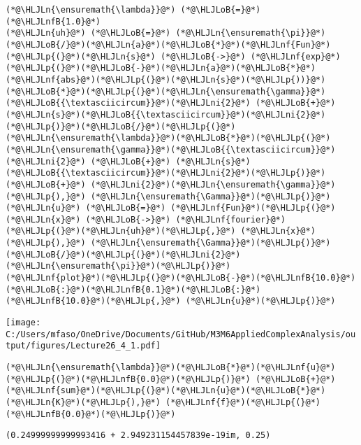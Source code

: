 \documentclass[12pt,landscape]{article}
\newcommand{\HLJLn}[1]{#1}
\newcommand{\HLJLnf}[1]{\textcolor[RGB]{66,102,213}{#1}}
\newcommand{\HLJLnfB}[1]{\textcolor[RGB]{59,151,46}{#1}}
\newcommand{\HLJLni}[1]{\textcolor[RGB]{59,151,46}{#1}}
\newcommand{\HLJLoB}[1]{\textcolor[RGB]{102,102,102}{\textbf{#1}}}
\newcommand{\HLJLp}[1]{#1}
\def\cent#1{\begin{center}#1\end{center} }
\begin{document}
{\begin{lstlisting}
(*@\HLJLn{\ensuremath{\lambda}}@*) (*@\HLJLoB{=}@*) (*@\HLJLnfB{1.0}@*)
(*@\HLJLn{uh}@*) (*@\HLJLoB{=}@*) (*@\HLJLn{\ensuremath{\pi}}@*)(*@\HLJLoB{/}@*)(*@\HLJLn{a}@*)(*@\HLJLoB{*}@*)(*@\HLJLnf{Fun}@*)(*@\HLJLp{(}@*)(*@\HLJLn{s}@*) (*@\HLJLoB{->}@*) (*@\HLJLnf{exp}@*)(*@\HLJLp{(}@*)(*@\HLJLoB{-}@*)(*@\HLJLn{a}@*)(*@\HLJLoB{*}@*)(*@\HLJLnf{abs}@*)(*@\HLJLp{(}@*)(*@\HLJLn{s}@*)(*@\HLJLp{))}@*)(*@\HLJLoB{*}@*)(*@\HLJLp{(}@*)(*@\HLJLn{\ensuremath{\gamma}}@*)(*@\HLJLoB{{\textasciicircum}}@*)(*@\HLJLni{2}@*) (*@\HLJLoB{+}@*) (*@\HLJLn{s}@*)(*@\HLJLoB{{\textasciicircum}}@*)(*@\HLJLni{2}@*)(*@\HLJLp{)}@*)(*@\HLJLoB{/}@*)(*@\HLJLp{(}@*)(*@\HLJLn{\ensuremath{\lambda}}@*)(*@\HLJLoB{*}@*)(*@\HLJLp{(}@*)(*@\HLJLn{\ensuremath{\gamma}}@*)(*@\HLJLoB{{\textasciicircum}}@*)(*@\HLJLni{2}@*) (*@\HLJLoB{+}@*) (*@\HLJLn{s}@*)(*@\HLJLoB{{\textasciicircum}}@*)(*@\HLJLni{2}@*)(*@\HLJLp{)}@*) (*@\HLJLoB{+}@*) (*@\HLJLni{2}@*)(*@\HLJLn{\ensuremath{\gamma}}@*)(*@\HLJLp{),}@*) (*@\HLJLn{\ensuremath{\Gamma}}@*)(*@\HLJLp{)}@*)
(*@\HLJLn{u}@*) (*@\HLJLoB{=}@*) (*@\HLJLnf{Fun}@*)(*@\HLJLp{(}@*)(*@\HLJLn{x}@*) (*@\HLJLoB{->}@*) (*@\HLJLnf{fourier}@*)(*@\HLJLp{(}@*)(*@\HLJLn{uh}@*)(*@\HLJLp{,}@*) (*@\HLJLn{x}@*)(*@\HLJLp{),}@*) (*@\HLJLn{\ensuremath{\Gamma}}@*)(*@\HLJLp{)}@*)(*@\HLJLoB{/}@*)(*@\HLJLp{(}@*)(*@\HLJLni{2}@*)(*@\HLJLn{\ensuremath{\pi}}@*)(*@\HLJLp{)}@*)
(*@\HLJLnf{plot}@*)(*@\HLJLp{(}@*)(*@\HLJLoB{-}@*)(*@\HLJLnfB{10.0}@*)(*@\HLJLoB{:}@*)(*@\HLJLnfB{0.1}@*)(*@\HLJLoB{:}@*)(*@\HLJLnfB{10.0}@*)(*@\HLJLp{,}@*) (*@\HLJLn{u}@*)(*@\HLJLp{)}@*)
\end{lstlisting}

\cent{\texttt{[image: C:/Users/mfaso/OneDrive/Documents/GitHub/M3M6AppliedComplexAnalysis/output/figures/Lecture26\_4\_1.pdf]}}

\begin{lstlisting}
(*@\HLJLn{\ensuremath{\lambda}}@*)(*@\HLJLoB{*}@*)(*@\HLJLnf{u}@*)(*@\HLJLp{(}@*)(*@\HLJLnfB{0.0}@*)(*@\HLJLp{)}@*) (*@\HLJLoB{+}@*)  (*@\HLJLnf{sum}@*)(*@\HLJLp{(}@*)(*@\HLJLn{u}@*)(*@\HLJLoB{*}@*)(*@\HLJLn{K}@*)(*@\HLJLp{),}@*) (*@\HLJLnf{f}@*)(*@\HLJLp{(}@*)(*@\HLJLnfB{0.0}@*)(*@\HLJLp{)}@*)
\end{lstlisting}

\begin{lstlisting}
(0.24999999999993416 + 2.949231154457839e-19im, 0.25)
\end{lstlisting}


}
\end{document}
